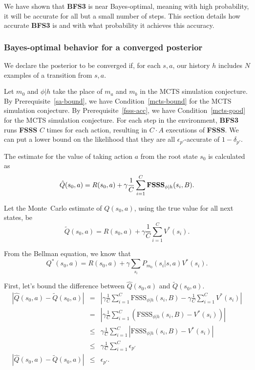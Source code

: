 We have shown that {\bf BFS3} is near Bayes-optimal, meaning with high probability, it will be accurate for all but a small number of steps. This section details how accurate {\bf BFS3} is and with what probability it achieves this accuracy.

\subsubsection{Bayes-optimal behavior for a converged posterior}
\label{sec-conv}
We declare the posterior to be converged if, for each $s,a$, our history $h$ includes $N$ examples of a transition from $s,a$.

Let $m_0$ and $\phi|h$ take the place of $m_a$ and $m_b$ in the MCTS simulation conjecture.
By Prerequisite~\ref{sa-bound}, we have Condition~\ref{mcts-bound} for the MCTS simulation conjecture. 
By Prerequisite~\ref{fsss-acc}, we have Condition~\ref{mcts-good} for the MCTS simulation conjecture.
For each step in the environment, {\bf BFS3} runs {\bf FSSS} $C$ times for each action, resulting in $C\cdot A$ executions of {\bf FSSS}. We can put a lower bound on the likelihood that they are all $\epsilon_{p'}$-accurate of $1-\delta_{p'}$.

The estimate for the value of taking action $a$ from the root state $s_0$ is calculated as
\begin{equation}
\hat Q(s_0, a) = R(s_0,a) + \gamma \frac 1 C \sum_{i=1}^C \mbox{\bf FSSS}_{\phi|h}(s_i, B).
\end{equation}

Let the Monte~Carlo estimate of $Q(s_0,a)$, using the true value for all next states, be
\begin{equation}
\tilde Q(s_0, a) = R(s_0,a) + \gamma \frac 1 C \sum_{i=1}^C V^*(s_i).
\end{equation}

From the Bellman equation, we know that
\begin{equation}
Q^*(s_0, a) = R(s_0,a) + \gamma \sum_{s_i} P_{m_0}(s_i|s,a) V^*(s_i).
\end{equation}

First, let's bound the difference between $\hat Q(s_0, a)$ and $\tilde Q(s_0, a)$.
\begin{eqnarray}
\nonumber |\hat Q(s_0, a) - \tilde Q(s_0, a)| &=& \left|\gamma \frac 1 C \sum_{i=1}^C \mbox{FSSS}_{\phi|h}(s_i, B) - \gamma \frac 1 C \sum_{i=1}^C V^*(s_i)\right|\\
\nonumber &=& \left|\gamma \frac 1 C \sum_{i=1}^C \left(\mbox{FSSS}_{\phi|h}(s_i, B) -  V^*(s_i)\right)\right|\\
\nonumber &\leq& \gamma \frac 1 C \sum_{i=1}^C \left|\mbox{FSSS}_{\phi|h}(s_i, B) -  V^*(s_i)\right|\\
\nonumber &\leq& \gamma \frac 1 C \sum_{i=1}^C \epsilon_{p'}\\
|\hat Q(s_0, a) - \tilde Q(s_0, a)| &\leq& \epsilon_{p'}.
\end{eqnarray}

